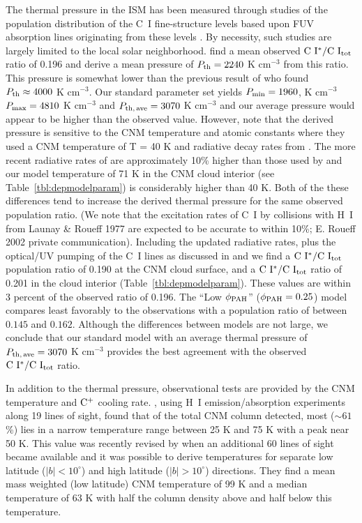 \documentclass[12pt,preprint,flushrt]{aastex}
\newcommand{\pthave}{P_{\rm th,\,ave}}
\begin{document}
The thermal pressure in the ISM has been measured through studies of the
population distribution of the C~I fine-structure levels based upon FUV
absorption lines originating from these levels \citep{jen83,jen01}.
By necessity, such studies are largely limited to the local solar
neighborhood. \cite{jen01} find a mean observed 
${\rm C~I^*/C~I_{tot}}$ ratio of 0.196 and derive a 
 mean pressure of $P_{\rm th} = 2240$
K cm$^{-3}$ from this ratio. This pressure is somewhat lower than the 
previous result of
\cite{jen83} who found $P_{\rm th} \approx
4000$ K cm$^{-3}$. Our standard parameter set yields $P_{\rm min} = 1960$,
K cm$^{-3}$ $P_{\rm max} = 4810$ K cm$^{-3}$ and 
$\pthave = 3070$ K cm$^{-3}$ and our average
pressure would appear to be higher than the observed value. However,
\cite{jen01} note that the derived pressure is sensitive to the
CNM temperature and atomic constants where they used a CNM temperature
of T = 40 K and radiative decay rates from \cite{fro85}.
The more recent radiative rates of \cite{gal97} are approximately
10\% higher than those used by \cite{jen01} and our 
model temperature of 71 K in the CNM cloud interior 
(see Table~\ref{tbl:depmodelparam}) is
considerably higher than 40 K. Both of the these differences tend
to increase the derived thermal pressure for the same 
observed population ratio. (We note that the excitation
rates of C~I by collisions with H~I from Launay \& Roueff 1977 
are expected to be accurate to within 10\%; E. Roueff 2002
private communication). Including the updated radiative rates, 
plus the optical/UV
pumping of the C~I lines as discussed in \cite{jen01} and \cite{jen79}
we find a ${\rm C~I^*/C~I_{tot}}$ 
population ratio of 0.190 at the CNM
cloud surface, and a ${\rm C~I^*/C~I_{tot}}$ ratio of 0.201 in the
 cloud interior
(Table~\ref{tbl:depmodelparam}). These values are within 
3 percent of the 
observed ratio of 0.196. The ``Low $\phi_{\rm PAH}$'' 
($\phi_{\rm PAH} = 0.25$)
model compares least favorably to the observations
with a population ratio of between $0.145$ and $0.162$.
Although the differences between models
are not large, 
we conclude that our standard model with an average thermal pressure of 
$\pthave = 3070$ K cm$^{-3}$ provides the best  agreement 
with the observed ${\rm C~I^*/C~I_{tot}}$ ratio.

In addition to the thermal pressure, observational tests are provided by the
CNM temperature and ${\rm C^+}$ cooling rate. \cite{hei01},
using H~I emission/absorption experiments along 19 lines of sight,
found that of the total CNM column detected, most ($\sim 61$\%)
lies in a narrow temperature range between
25 K and 75 K with a peak near 50 K.  This value was recently revised
by \cite{hei02} when an additional 60 lines of sight became available 
and it was possible to derive temperatures for separate low latitude 
($|b| < 10^\circ$)
and high  latitude ($|b| > 10^\circ$)
directions. They find a mean mass weighted 
(low latitude) CNM temperature of 99 K and a median temperature of
63 K with half the column density above and half below this temperature.
\end{document}
